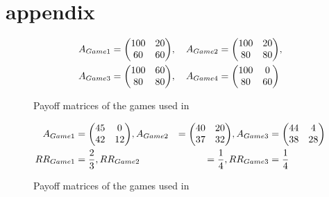 \documentclass[12pt]{article}
\begin{document}
\section{appendix}
\begin{figure}[H]
\label{fig:payoffschmidt}
\caption{Payoff matrices of the games used in \cite{schmidt_playing_2003}}
\begin{alignat*}{3}
        A_{Game1} = \mqty( 100 & 20 \\ 60 & 60), \quad A_{Game2} 
                               &= \mqty( 100 & 20 \\ 80 & 80), \\ 
        A_{Game3} = \mqty( 100 
             & 60 \\ 80 & 80), \quad A_{Game4} &= \mqty( 100
                             & 0 \\ 80 & 60)
        \end{alignat*}
\end{figure}
\begin{figure}[H]
        \caption{Payoff matrices of the games used
        in \cite{dubois_optimization_2012}}
        \label{fig:payoffdubois}
        \begin{alignat*}{3}     
                A_{Game1} &= \mqty(45 & 0 \\ 42 & 12),
                A_{Game2} &= \mqty(40 & 20 \\37 & 32),
                A_{Game3} &= \mqty(44 & 4 \\ 38 & 28) \\
                RR_{Game1}&= \frac 23, RR_{Game2}&=\frac 14, RR_{Game3}&=
                \frac 14
        \end{alignat*}
\end{figure}
\printbibliography
\end{document}
